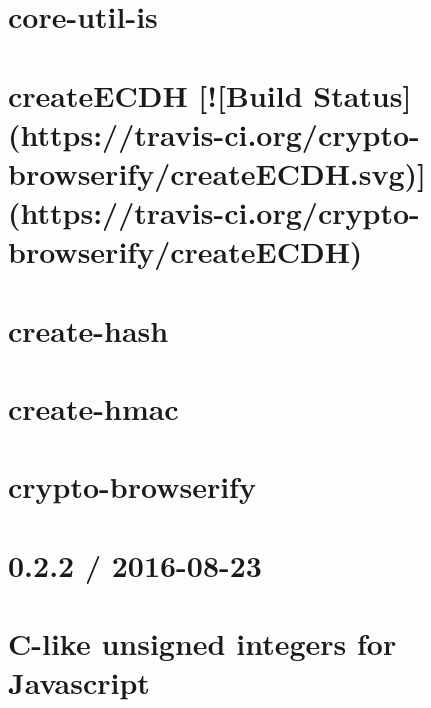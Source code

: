 \documentclass[twoside]{book}
\newcommand{\+}{\discretionary{\mbox{\scriptsize$\hookleftarrow$}}{}{}}
\begin{document}
\chapter{core-\/util-\/is}
\label{md_dsmacc_examples_DRmerge_node_modules_core-util-is_README}

\chapter{create\+E\+C\+DH \mbox{[}!\mbox{[}Build Status\mbox{]}(https\+://travis-\/ci.org/crypto-\/browserify/create\+E\+C\+DH.svg)\mbox{]}(https\+://travis-\/ci.org/crypto-\/browserify/create\+E\+C\+DH)}
\label{md_dsmacc_examples_DRmerge_node_modules_create-ecdh_readme}

\chapter{create-\/hash}
\label{md_dsmacc_examples_DRmerge_node_modules_create-hash_README}

\chapter{create-\/hmac}
\label{md_dsmacc_examples_DRmerge_node_modules_create-hmac_README}

\chapter{crypto-\/browserify}
\label{md_dsmacc_examples_DRmerge_node_modules_crypto-browserify_README}

\chapter{0.2.2 / 2016-\/08-\/23}
\label{md_dsmacc_examples_DRmerge_node_modules_cuint_History}

\chapter{C-\/like unsigned integers for Javascript}
\label{md_dsmacc_examples_DRmerge_node_modules_cuint_README}

\end{document}

